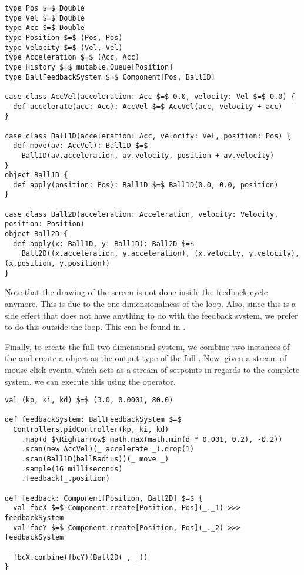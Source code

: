 \hspace*{-\parindent}
\begin{minipage}{\linewidth}
\begin{lstlisting}[style=ScalaStyle, caption={Ball motion physics}, label={lst:ball-physics-new}]
type Pos $=$ Double
type Vel $=$ Double
type Acc $=$ Double
type Position $=$ (Pos, Pos)
type Velocity $=$ (Vel, Vel)
type Acceleration $=$ (Acc, Acc)
type History $=$ mutable.Queue[Position]
type BallFeedbackSystem $=$ Component[Pos, Ball1D]

case class AccVel(acceleration: Acc $=$ 0.0, velocity: Vel $=$ 0.0) {
  def accelerate(acc: Acc): AccVel $=$ AccVel(acc, velocity + acc)
}

case class Ball1D(acceleration: Acc, velocity: Vel, position: Pos) {
  def move(av: AccVel): Ball1D $=$
    Ball1D(av.acceleration, av.velocity, position + av.velocity)
}
object Ball1D {
  def apply(position: Pos): Ball1D $=$ Ball1D(0.0, 0.0, position)
}

case class Ball2D(acceleration: Acceleration, velocity: Velocity, position: Position)
object Ball2D {
  def apply(x: Ball1D, y: Ball1D): Ball2D $=$
    Ball2D((x.acceleration, y.acceleration), (x.velocity, y.velocity), (x.position, y.position))
}
\end{lstlisting}
\end{minipage}

Note that the drawing of the screen is not done inside the feedback cycle anymore. This is due to the one-dimensionalness of the loop. Also, since this is a side effect that does not have anything to do with the feedback system, we prefer to do this outside the loop. This can be found in .

Finally, to create the full two-dimensional system, we combine two instances of the  and create a  object as the output type of the full \comp. Now, given a stream of mouse click events, which acts as a stream of setpoints in regards to the complete system, we can execute this \comp using the  operator.

\hspace*{-\parindent}
\begin{minipage}{\linewidth}
\begin{lstlisting}[style=ScalaStyle, caption={Ball movement feedback system}, label={lst:ball-feedback-new}]
val (kp, ki, kd) $=$ (3.0, 0.0001, 80.0)

def feedbackSystem: BallFeedbackSystem $=$
  Controllers.pidController(kp, ki, kd)
    .map(d $\Rightarrow$ math.max(math.min(d * 0.001, 0.2), -0.2))
    .scan(new AccVel)(_ accelerate _).drop(1)
    .scan(Ball1D(ballRadius))(_ move _)
    .sample(16 milliseconds)
    .feedback(_.position)

def feedback: Component[Position, Ball2D] $=$ {
  val fbcX $=$ Component.create[Position, Pos](_._1) >>> feedbackSystem
  val fbcY $=$ Component.create[Position, Pos](_._2) >>> feedbackSystem

  fbcX.combine(fbcY)(Ball2D(_, _))
}
\end{lstlisting}
\end{minipage}

